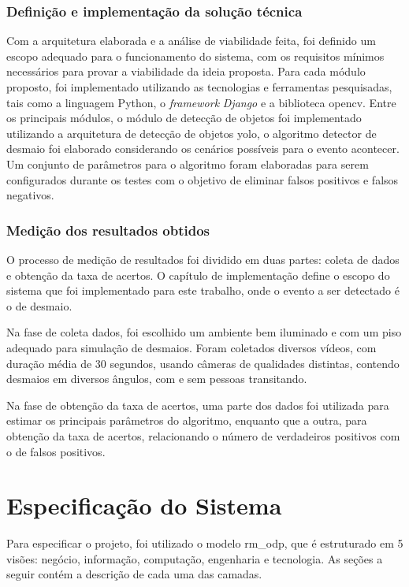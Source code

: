 \documentclass[]{politex}
\begin{document}
\subsection{Definição e implementação da solução técnica}
Com a arquitetura elaborada e a análise de viabilidade feita, foi definido um escopo adequado para o funcionamento do sistema, com os requisitos mínimos necessários para provar a viabilidade da ideia proposta. Para cada módulo proposto, foi implementado utilizando as tecnologias e ferramentas pesquisadas, tais como a linguagem Python, o \textit{framework} \textit{Django} e a biblioteca \acrshort{opencv}. Entre os principais módulos, o módulo de detecção de objetos foi implementado utilizando a arquitetura de detecção de objetos \acrshort{yolo}, o algoritmo detector de desmaio foi elaborado considerando os cenários possíveis para o evento acontecer. Um conjunto de parâmetros para o algoritmo foram elaboradas para serem configurados durante os testes com o objetivo de eliminar falsos positivos e falsos negativos.

\subsection{Medição dos resultados obtidos}
O processo de medição de resultados foi dividido em duas partes: coleta de dados e obtenção da taxa de acertos. O capítulo de implementação define o escopo do sistema que foi implementado para este trabalho, onde o evento a ser detectado é o de desmaio.

Na fase de coleta dados, foi escolhido um ambiente bem iluminado e com um piso adequado para simulação de desmaios. Foram coletados diversos vídeos, com duração média de 30 segundos, usando câmeras de qualidades distintas, contendo desmaios em diversos ângulos, com e sem pessoas transitando. 

Na fase de obtenção da taxa de acertos, uma parte dos dados foi utilizada para estimar os principais parâmetros do algoritmo, enquanto que a outra, para obtenção da taxa de acertos, relacionando o número de verdadeiros positivos com o de falsos positivos. 

\chapter{Especificação do Sistema}
Para especificar o projeto, foi utilizado o modelo \acrfull{rm_odp}, que é estruturado em 5 visões: negócio, informação, computação, engenharia e tecnologia. As seções a seguir contém a descrição de cada uma das camadas.
\end{document}
